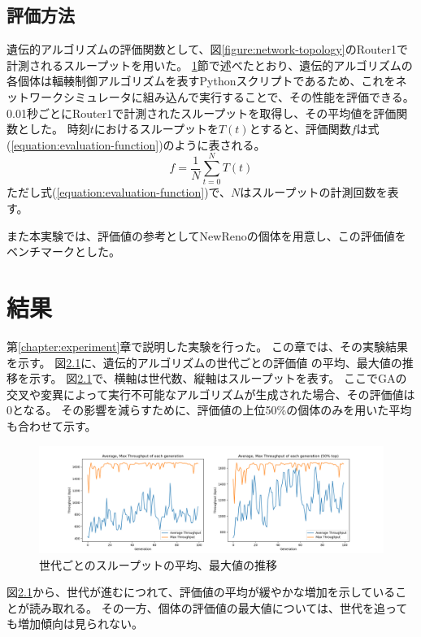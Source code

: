\documentclass[a4paper,11pt]{jreport}
\newcommand{\figref}[1]{図\ref{#1}}
\newcommand{\chapref}[1]{第\ref{#1}章}
\newcommand{\secref}[1]{\ref{#1}節}
\newcommand{\equationref}[1]{式(\ref{#1})}
\begin{document}
\section{評価方法}
\label{section:evaluation-method}

遺伝的アルゴリズムの評価関数として、\figref{figure:network-topology}のRouter1で計測されるスループットを用いた。
\secref{section:evaluation-method}で述べたとおり、遺伝的アルゴリズムの各個体は輻輳制御アルゴリズムを表すPythonスクリプトであるため、これをネットワークシミュレータに組み込んで実行することで、その性能を評価できる。
0.01秒ごとにRouter1で計測されたスループットを取得し、その平均値を評価関数とした。
時刻$t$におけるスループットを$T(t)$とすると、評価関数$f$は\equationref{equation:evaluation-function}のように表される。
\begin{equation}
  \label{equation:evaluation-function}
  f = \frac{1}{N} \sum_{t=0}^{N} T(t)
\end{equation}
ただし\equationref{equation:evaluation-function}で、$N$はスループットの計測回数を表す。

また本実験では、評価値の参考としてNewRenoの個体を用意し、この評価値をベンチマークとした。

\newpage

\chapter{結果}

\label{chapter:result}
\chapref{chapter:experiment}で説明した実験を行った。
この章では、その実験結果を示す。
\figref{figure:generation_throughput}に、遺伝的アルゴリズムの世代ごとの評価値
の平均、最大値の推移を示す。
\figref{figure:generation_throughput}で、横軸は世代数、縦軸はスループットを表す。
ここでGAの交叉や変異によって実行不可能なアルゴリズムが生成された場合、その評価値は0となる。
その影響を減らすために、評価値の上位50\%の個体のみを用いた平均も合わせて示す。
\begin{figure}[thbp]
  \setlength\fboxsep{0pt}
  \centering
  \includegraphics[width=0.9\linewidth]{fig/chap05/generation_throughput.png}
  \caption{世代ごとのスループットの平均、最大値の推移}
  \label{figure:generation_throughput}
\end{figure}
\figref{figure:generation_throughput}から、世代が進むにつれて、評価値の平均が緩やかな増加を示していることが読み取れる。
その一方、個体の評価値の最大値については、世代を追っても増加傾向は見られない。
\end{document}
